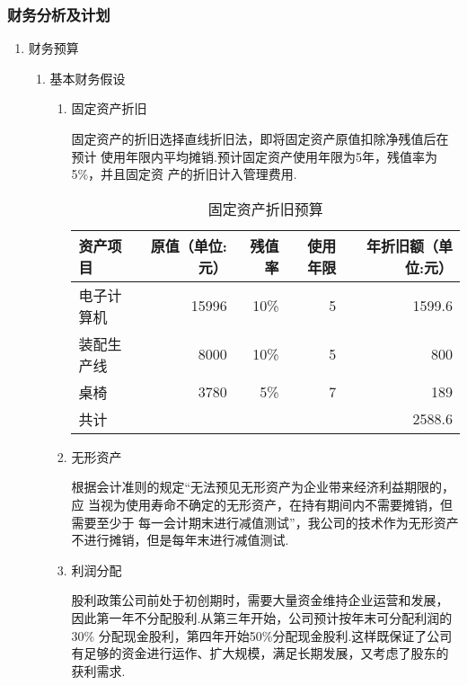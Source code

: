 \subsubsection{财务分析及计划}
\begin{enumerate}
\item 财务预算
      \begin{enumerate}[(1)]
      \item 基本财务假设
            \begin{enumerate}[$\bullet$]
            \item 固定资产折旧

                  固定资产的折旧选择直线折旧法，即将固定资产原值扣除净残值后在预计 使用年限内平均摊销.预计固定资产使用年限为5年，残值率为5\%，并且固定资 产的折旧计入管理费用.

                  \begin{table}[H]
                  \centering
                  \caption{固定资产折旧预算}
                  \begin{tabular}{|lrrrr|}
                  \toprule
                  资产项目  & 原值（单位:元） & 残值率 & 使用年限 & 年折旧额（单位:元） \\
                  \hline
                  电子计算机 & 15996 & 10\%  & 5     & 1599.6 \\
                  装配生产线 & 8000  & 10\%  & 5     & 800 \\
                  桌椅    & 3780  & 5\%   & 7     & 189 \\
                  共计    &       &       &       & 2588.6 \\
                  \bottomrule
                  \end{tabular}%
                  \label{tab:addlabel}%
                  \end{table}%

            \item 无形资产

                  根据会计准则的规定“无法预见无形资产为企业带来经济利益期限的，应 当视为使用寿命不确定的无形资产，在持有期间内不需要摊销，但需要至少于 每一会计期末进行减值测试”，我公司的技术作为无形资产不进行摊销，但是每年末进行减值测试.

            \item 利润分配

                  股利政策公司前处于初创期时，需要大量资金维持企业运营和发展，因此第一年不分配股利.从第三年开始，公司预计按年末可分配利润的30\% 分配现金股利，第四年开始50\%分配现金股利.这样既保证了公司有足够的资金进行运作、扩大规模，满足长期发展，又考虑了股东的获利需求.


\end{enumerate}
\end{enumerate}
\end{enumerate}
